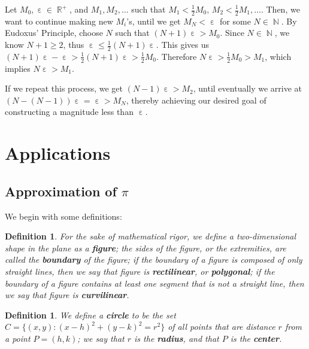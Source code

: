\documentclass[letterpaper, 12pt]{amsart}
\DeclareMathOperator{\N}{\mathbb{N}}
\DeclareMathOperator{\R}{\mathbb{R}}
\DeclareMathOperator{\ep}{\varepsilon}
\newtheorem{defn}[thm]{Definition}
\theoremstyle{definition}  %
\begin{document}
		Let $M_{0}, \ep \in \R^{+}$, and $M_{1}, M_{2}, \dots$ such that $M_{1} < \tfrac{1}{2}M_{0}, \, M_{2} < \tfrac{1}{2}M_{1}, \dots$.
		Then, we want to continue making new $M_{i}$'s, until we get $M_{N} < \ep$ for some $N \in \N$.
		By Eudoxus' Principle, choose $N$ such that $(N+1)\ep > M_{0}$.
		Since $N \in \N$, we know $N+1 \geq 2$, thus $\ep \leq \frac{1}{2}(N+1)\ep$.
		This gives us $(N+1)\ep - \ep > \tfrac{1}{2}(N+1)\ep > \tfrac{1}{2}M_{0}$.
		Therefore $N\ep > \tfrac{1}{2}M_{0} > M_{1}$, which implies $N\ep > M_{1}$.

		If we repeat this process, we get $(N-1)\ep > M_{2}$, until eventually we arrive at $(N - (N-1))\ep = \ep > M_{N}$, thereby achieving our desired goal of constructing a magnitude less than $\ep$.

	\section{Applications}
	\label{sec:applications}
		\subsection{Approximation of $\pi$}
		\label{sub:approximation_of_pi}
		We begin with some definitions:
		\begin{defn}
		\label{defn:fig}
		For the sake of mathematical rigor, we define a two-dimensional shape in the plane as a \textbf{figure}; the sides of the figure, or the extremities, are called the \textbf{boundary} of the figure; if the boundary of a figure is composed of only straight lines, then we say that figure is \textbf{rectilinear}, or \textbf{polygonal}; if the boundary of a figure contains at least one segment that is not a straight line, then we say that figure is \textbf{curvilinear}.
		\end{defn}

		\begin{defn}
		\label{defn:circle}
		We define a \textbf{circle} to be the set $C = \{ (x,y) : (x - h)^{2} + (y - k)^{2} = r^{2} \}$ of all points that are distance $r$ from a point $P = (h,k)$; we say that $r$ is the \textbf{radius}, and that $P$ is the \textbf{center}.
		\end{defn}
\end{document}
